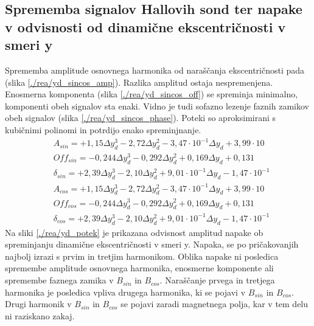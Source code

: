 \subsection{Sprememba signalov Hallovih sond ter napake v odvisnosti od dinamične ekscentričnosti v smeri y}
Sprememba amplitude osnovnega harmonika od naraščanja ekscentričnosti pada (slika \ref{./rea/yd_sincos_amp}). Razlika amplitud ostaja nespremenjena. Enosmerna komponenta (slika \ref{./rea/yd_sincos_off}) se spreminja minimalno, komponenti obeh signalov sta enaki. Vidno je tudi sofazno lezenje faznih zamikov obeh signalov (slika \ref{./rea/yd_sincos_phase}). Poteki so aproksimirani s kubičnimi polinomi in potrdijo enako spreminjnanje.
\begin{eqnarray}
&A_{sin} = +1,15\Delta y_d^3-2,72\Delta y_d^2-3,47\cdot 10^{-1}\Delta y_d+3,99\cdot 10\\     
&Off_{sin} = -0,244\Delta y_d^3-0,292\Delta y_d^2+0,169\Delta y_d+0,131\\   
&\delta_{sin} = +2,39\Delta y_d^3-2,10\Delta y_d^2+9,01\cdot 10^{-1}\Delta y_d-1,47\cdot 10^{-1}\\
&A_{cos} = +1,15\Delta y_d^3-2,72\Delta y_d^2-3,47\cdot 10^{-1}\Delta y_d+3,99\cdot 10\\     
&Off_{cos} = -0,244\Delta y_d^3-0,292\Delta y_d^2+0,169\Delta y_d+0,131\\   
&\delta_{cos} = +2,39\Delta y_d^3-2,10\Delta y_d^2+9,01\cdot 10^{-1}\Delta y_d-1,47\cdot 10^{-1} 
\end{eqnarray}
Na sliki \ref{./rea/yd_potek} je prikazana odvisnost amplitud napake ob spreminjanju dinamične ekscentričnosti v smeri y. Napaka, se po pričakovanjih najbolj izrazi s prvim in tretjim harmonikom. Oblika napake ni posledica spremembe amplitude osnovnega harmonika, enosmerne komponente ali spremembe faznega zamika v $B_{sin}$ in $B_{cos}$. Naraščanje prvega in tretjega harmonika je posledica vpliva drugega harmonika, ki se pojavi v $B_{sin}$ in $B_{cos}$. Drugi harmonik v $B_{sin}$ in $B_{cos}$ se pojavi zaradi magnetnega polja, kar v tem delu ni raziskano zakaj.
